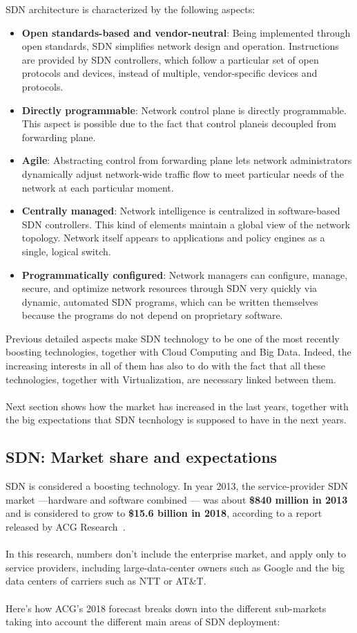 \documentclass[a4paper, 12pt]{book}
\begin{document}
SDN architecture is characterized by the following aspects:
\begin{itemize}
\item{\textbf{Open standards-based and vendor-neutral}}: Being implemented through open standards, SDN simplifies network design and operation. Instructions are provided by SDN controllers, which follow a particular set of open protocols and devices, instead of multiple, vendor-specific devices and protocols.
\item{\textbf{Directly programmable}}: Network control plane is directly programmable. This aspect is possible due to the fact that control planeis decoupled from forwarding plane.
\item{\textbf{Agile}}: Abstracting control from forwarding plane lets network administrators dynamically adjust network-wide traffic flow to meet particular needs of the network at each particular moment.
\item{\textbf{Centrally managed}}: Network intelligence is centralized in software-based SDN controllers. This kind of elements maintain a global view of the network topology. Network itself appears to applications and policy engines as a single, logical switch.
\item{\textbf{Programmatically configured}}: Network managers can configure, manage, secure, and optimize network resources through SDN very quickly via dynamic, automated SDN programs, which can be written themselves because the programs do not depend on proprietary software.
\end{itemize}
Previous detailed aspects make SDN technology to be one of the most recently boosting technologies, together with Cloud Computing and Big Data. Indeed, the increasing interests in all of them has also to do with the fact that all these technologies, together with Virtualization, are necessary linked between them.\\
\\
Next section shows how the market has increased in the last years, together with the big expectations that SDN tecnhology is supposed to have in the next years.

\subsection{SDN: Market share and expectations}

SDN is considered a boosting technology. In year 2013, the service-provider SDN market —hardware and software combined — was about \textbf{\$840 million in 2013} and is considered to grow to \textbf{\$15.6 billion in 2018}, according to a report released by ACG Research~\cite{SDN2018expectations00}.\\
\\
In this research, numbers don’t include the enterprise market, and apply only to service providers, including large-data-center owners such as Google and the big data centers of carriers such as NTT or AT\&T.\\
\\
Here’s how ACG’s 2018 forecast breaks down into the different sub-markets taking into account the different main areas of SDN deployment:
\end{document}
